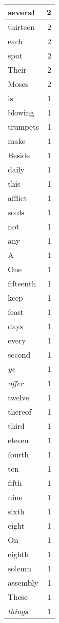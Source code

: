 \begin{center}
\begin{longtable}{l|r}
several & 2\\ \hline 
thirteen & 2\\ \hline 
each & 2\\ \hline 
spot & 2\\ \hline 
Their & 2\\ \hline 
Moses & 2\\ \hline 
is & 1\\ \hline 
blowing & 1\\ \hline 
trumpets & 1\\ \hline 
make & 1\\ \hline 
Beside & 1\\ \hline 
daily & 1\\ \hline 
this & 1\\ \hline 
afflict & 1\\ \hline 
souls & 1\\ \hline 
not & 1\\ \hline 
any & 1\\ \hline 
A & 1\\ \hline 
One & 1\\ \hline 
fifteenth & 1\\ \hline 
keep & 1\\ \hline 
feast & 1\\ \hline 
days & 1\\ \hline 
every & 1\\ \hline 
second & 1\\ \hline 
\emph{ye} & 1\\ \hline 
\emph{offer} & 1\\ \hline 
twelve & 1\\ \hline 
thereof & 1\\ \hline 
third & 1\\ \hline 
eleven & 1\\ \hline 
fourth & 1\\ \hline 
ten & 1\\ \hline 
fifth & 1\\ \hline 
nine & 1\\ \hline 
sixth & 1\\ \hline 
eight & 1\\ \hline 
On & 1\\ \hline 
eighth & 1\\ \hline 
solemn & 1\\ \hline 
assembly & 1\\ \hline 
These & 1\\ \hline 
\emph{things} & 1\\ \hline 

\end{longtable}
\end{center}
